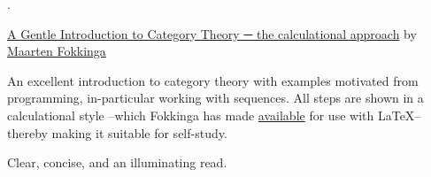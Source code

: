 \documentclass[11pt]{article}
\begin{document}
{\color{white}.}

\href{https://maartenfokkinga.github.io/utwente/mmf92b.pdf}{A Gentle Introduction to Category Theory ─ the calculational approach}
\newline
by \href{https://maartenfokkinga.github.io/utwente/}{Maarten Fokkinga}

\vspace{1em}

An excellent introduction to category theory with examples motivated from programming, in-particular
working with sequences. All steps are shown in a calculational style --which Fokkinga
has made \href{https://ctan.org/tex-archive/macros/latex/contrib/calculation}{available} for use with \LaTeX{}-- thereby making it suitable for self-study.

\vspace{1em}

Clear, concise, and an illuminating read.

\newpage
\end{document}
